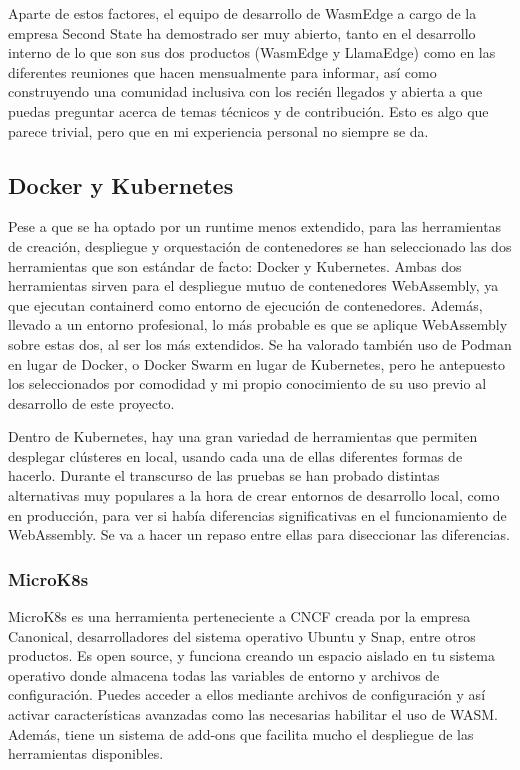 Aparte de estos factores, el equipo de desarrollo de WasmEdge a cargo de la empresa Second State ha demostrado ser muy abierto, tanto en el desarrollo interno de lo que son sus dos productos (WasmEdge y LlamaEdge) como en las diferentes reuniones que hacen mensualmente para informar, así como construyendo una comunidad inclusiva con los recién llegados y abierta a que puedas preguntar acerca de temas técnicos y de contribución. Esto es algo que parece trivial, pero que en mi experiencia personal no siempre se da.

\subsection{Docker y Kubernetes}
\label{sub:docker-y-k8s}

Pese a que se ha optado por un runtime menos extendido, para las herramientas de creación, despliegue y orquestación de contenedores se han seleccionado las dos herramientas que son estándar de facto: Docker y Kubernetes. Ambas dos herramientas sirven para el despliegue mutuo de contenedores WebAssembly, ya que ejecutan containerd como entorno de ejecución de contenedores. Además, llevado a un entorno profesional, lo más probable es que se aplique WebAssembly sobre estas dos, al ser los más extendidos. Se ha valorado también uso de Podman en lugar de Docker, o Docker Swarm en lugar de Kubernetes, pero he antepuesto los seleccionados por comodidad y mi propio conocimiento de su uso previo al desarrollo de este proyecto.

Dentro de Kubernetes, hay una gran variedad de herramientas que permiten desplegar clústeres en local, usando cada una de ellas diferentes formas de hacerlo. Durante el transcurso de las pruebas se han probado distintas alternativas muy populares a la hora de crear entornos de desarrollo local, como en producción, para ver si había diferencias significativas en el funcionamiento de WebAssembly. Se va a hacer un repaso entre ellas para diseccionar las diferencias.

\subsubsection{MicroK8s}
\label{subsub:microk8s}

MicroK8s es una herramienta perteneciente a CNCF creada por la empresa Canonical, desarrolladores del sistema operativo Ubuntu y Snap, entre otros productos. Es open source, y funciona creando un espacio aislado en tu sistema operativo donde almacena todas las variables de entorno y archivos de configuración. Puedes acceder a ellos mediante archivos de configuración y así activar características avanzadas como las necesarias habilitar el uso de WASM. Además, tiene un sistema de add-ons que facilita mucho el despliegue de las herramientas disponibles.

